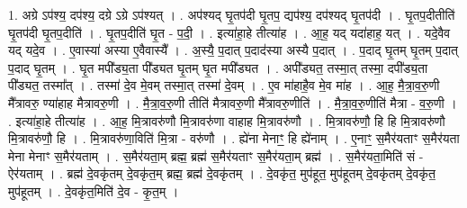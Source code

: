 \documentclass[17pt]{extarticle}
\begin{document}
1. अग्रे ऽप॑श्य॒ दप॑श्य॒ दग्रे ऽग्रे ऽप॑श्यत् । . अप॑श्यद् घृ॒तप॑दी घृ॒तप॒ द्यप॑श्य॒ दप॑श्यद् घृ॒तप॑दी । . घृ॒तप॒दीतीति॑ घृ॒तप॑दी घृ॒तप॒दीति॑ । . घृ॒तप॒दीति॑ घृ॒त - प॒दी॒ । . इत्या॑हा॒हे तीत्या॑ह । . आ॒ह॒ यद् यदा॑हाह॒ यत् । . यदे॒वैव यद् यदे॒व । . ए॒वास्या॑ अस्या ए॒वैवास्यै᳚ । . अ॒स्यै॒ प॒दात् प॒दाद॑स्या अस्यै प॒दात् । . प॒दाद् घृ॒तम् घृ॒तम् प॒दात् प॒दाद् घृ॒तम् । . घृ॒त मपी᳚ड्य॒ता पी᳚ड्यत घृ॒तम् घृ॒त मपी᳚ड्यत । . अपी᳚ड्यत॒ तस्मा॒त् तस्मा॒ दपी᳚ड्य॒ता पी᳚ड्यत॒ तस्मा᳚त् । . तस्मा॑ दे॒व मे॒वम् तस्मा॒त् तस्मा॑ दे॒वम् । . ए॒व मा॑हाहै॒व मे॒व मा॑ह । . आ॒ह॒ मै॒त्रा॒व॒रु॒णी मै᳚त्रावरु॒ ण्या॑हाह मैत्रावरु॒णी । . मै॒त्रा॒व॒रु॒णी तीति॑ मैत्रावरु॒णी मै᳚त्रावरु॒णीति॑ । . मै॒त्रा॒व॒रु॒णीति॑ मैत्रा - व॒रु॒णी । . इत्या॑हा॒हे तीत्या॑ह । . आ॒ह॒ मि॒त्रावरु॑णौ मि॒त्रावरु॑णा वाहाह मि॒त्रावरु॑णौ । . मि॒त्रावरु॑णौ॒ हि हि मि॒त्रावरु॑णौ मि॒त्रावरु॑णौ॒ हि । . मि॒त्रावरु॑णा॒विति॑ मि॒त्रा - वरु॑णौ । . ह्ये॑ना मेनाꣳ॒॒ हि ह्ये॑नाम् । . ए॒नाꣳ॒॒ स॒मैर॑यताꣳ स॒मैर॑यता मेना मेनाꣳ स॒मैर॑यताम् । . स॒मैर॑यता॒म् ब्रह्म॒ ब्रह्म॑ स॒मैर॑यताꣳ स॒मैर॑यता॒म् ब्रह्म॑ । . स॒मैर॑यता॒मिति॑ सं - ऐर॑यताम् । . ब्रह्म॑ दे॒वकृ॑तम् दे॒वकृ॑त॒म् ब्रह्म॒ ब्रह्म॑ दे॒वकृ॑तम् । . दे॒वकृ॑त॒ मुप॑हूत॒ मुप॑हूतम् दे॒वकृ॑तम् दे॒वकृ॑त॒ मुप॑हूतम् । . दे॒वकृ॑त॒मिति॑ दे॒व - कृ॒त॒म् । \newline
\end{document}

